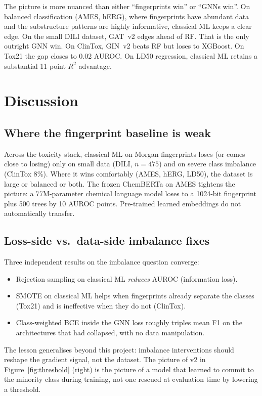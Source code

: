 \documentclass[a4paper,11pt]{article}
\begin{document}
The picture is more nuanced than either ``fingerprints win'' or ``GNNs win''. On balanced classification (AMES, hERG), where fingerprints have abundant data and the substructure patterns are highly informative, classical ML keeps a clear edge. On the small DILI dataset, GAT~v2 edges ahead of RF. That is the only outright GNN win. On ClinTox, GIN~v2 beats RF but loses to XGBoost. On Tox21 the gap closes to 0.02 AUROC. On LD50 regression, classical ML retains a substantial 11-point $R^2$ advantage.

\section{Discussion}

\subsection{Where the fingerprint baseline is weak}

Across the toxicity stack, classical ML on Morgan fingerprints loses (or comes close to losing) only on small data (DILI, $n{=}475$) and on severe class imbalance (ClinTox 8\%). Where it wins comfortably (AMES, hERG, LD50), the dataset is large or balanced or both. The frozen ChemBERTa on AMES tightens the picture: a 77M-parameter chemical language model loses to a 1024-bit fingerprint plus 500 trees by 10 AUROC points. Pre-trained learned embeddings do not automatically transfer.

\subsection{Loss-side vs.\ data-side imbalance fixes}

Three independent results on the imbalance question converge:
\begin{itemize}
\item Rejection sampling on classical ML \emph{reduces} AUROC (information loss).
\item SMOTE on classical ML helps when fingerprints already separate the classes (Tox21) and is ineffective when they do not (ClinTox).
\item Class-weighted BCE inside the GNN loss roughly triples mean F1 on the architectures that had collapsed, with no data manipulation.
\end{itemize}
The lesson generalises beyond this project: imbalance interventions should reshape the gradient signal, not the dataset. The picture of v2 in Figure~\ref{fig:threshold} (right) is the picture of a model that learned to commit to the minority class during training, not one rescued at evaluation time by lowering a threshold.
\end{document}
